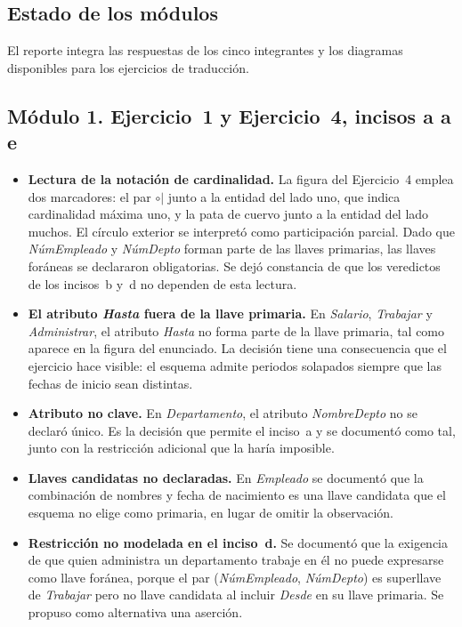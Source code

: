 \subsection{Estado de los módulos}

El reporte integra las respuestas de los cinco integrantes y los diagramas
disponibles para los ejercicios de traducción.

\subsection{Módulo 1. Ejercicio~1 y Ejercicio~4, incisos a a e}

\begin{itemize}
  \item \textbf{Lectura de la notación de cardinalidad.} La figura del
        Ejercicio~4 emplea dos marcadores: el par $\circ|$ junto a la entidad
        del lado uno, que indica cardinalidad máxima uno, y la pata de cuervo
        junto a la entidad del lado muchos. El círculo exterior se interpretó
        como participación parcial. Dado que \emph{NúmEmpleado} y
        \emph{NúmDepto} forman parte de las llaves primarias, las llaves
        foráneas se declararon obligatorias. Se dejó constancia de que los
        veredictos de los incisos~b y~d no dependen de esta lectura.
  \item \textbf{El atributo \emph{Hasta} fuera de la llave primaria.} En
        \emph{Salario}, \emph{Trabajar} y \emph{Administrar}, el atributo
        \emph{Hasta} no forma parte de la llave primaria, tal como aparece en
        la figura del enunciado. La decisión tiene una consecuencia que el
        ejercicio hace visible: el esquema admite periodos solapados siempre
        que las fechas de inicio sean distintas.
  \item \textbf{Atributo no clave.} En \emph{Departamento}, el atributo
        \emph{NombreDepto} no se declaró único. Es la decisión que permite el
        inciso~a y se documentó como tal, junto con la restricción adicional
        que la haría imposible.
  \item \textbf{Llaves candidatas no declaradas.} En \emph{Empleado} se
        documentó que la combinación de nombres y fecha de nacimiento es una
        llave candidata que el esquema no elige como primaria, en lugar de
        omitir la observación.
  \item \textbf{Restricción no modelada en el inciso~d.} Se documentó que la
        exigencia de que quien administra un departamento trabaje en él no
        puede expresarse como llave foránea, porque el par
        (\emph{NúmEmpleado}, \emph{NúmDepto}) es superllave de \emph{Trabajar}
        pero no llave candidata al incluir \emph{Desde} en su llave primaria.
        Se propuso como alternativa una aserción.
\end{itemize}

